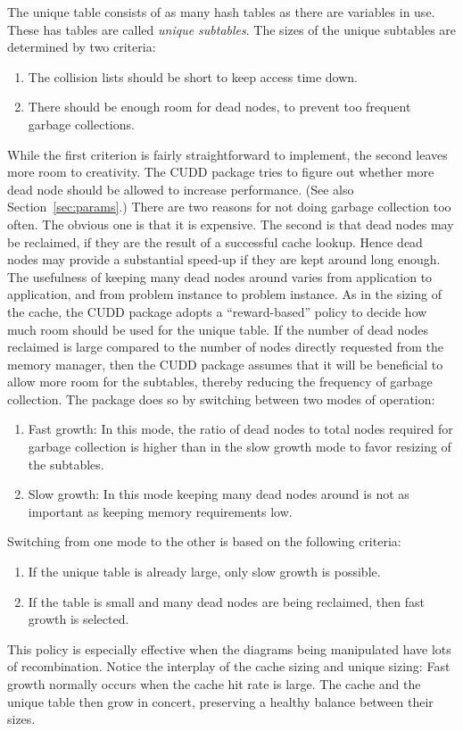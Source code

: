 \documentclass[11pt]{article}
\begin{document}
The unique table consists of as many hash tables as
there are variables in use. These has tables are called \emph{unique
  subtables}.  The sizes of the unique subtables are determined by two
criteria:
\begin{enumerate}
\item The collision lists should be short
  to keep access time down.
\item There should be enough room for dead nodes, to
  prevent too frequent garbage collections.
\end{enumerate}
While the first criterion is fairly straightforward to implement, the
second leaves more room to creativity. The CUDD package tries to
figure out whether more dead node should be allowed to increase
performance.  (See also Section~\ref{sec:params}.) There are two
reasons for not doing garbage collection too often. The obvious one is
that it is expensive.  The second is that dead nodes may be
reclaimed, if they are the result of a
successful cache lookup. Hence dead nodes may provide a substantial
speed-up if they are kept around long enough.  The usefulness of
keeping many dead nodes around varies from application to application,
and from problem instance to problem instance. As in the sizing of the
cache, the CUDD package adopts a
``reward-based'' policy to
decide how much room should be used for the unique table. If the
number of dead nodes reclaimed is large compared to the number of
nodes directly requested from the memory manager, then the CUDD
package assumes that it will be beneficial to allow more room for the
subtables, thereby reducing the frequency of garbage collection.  The
package does so by switching between two modes of operation:
\begin{enumerate}
\item Fast growth: In this mode, the
  ratio of dead nodes to total nodes required for garbage collection
  is higher than in the slow growth mode to favor resizing
  of the subtables.
\item Slow growth: In this
  mode keeping many dead nodes around is not as important as
  keeping memory requirements low.
\end{enumerate}
Switching from one mode to the other is based on the following
criteria:
\begin{enumerate}
\item If the unique table is already large, only slow growth is
  possible.
\item If the table is small and many dead nodes are being reclaimed,
  then fast growth is selected.
\end{enumerate}
This policy is especially effective when the diagrams being
manipulated have lots of recombination. Notice the interplay of the
cache sizing and unique sizing: Fast growth normally occurs when the
cache hit rate is large. The cache and the unique table then grow in
concert, preserving a healthy balance between their sizes.
\end{document}
